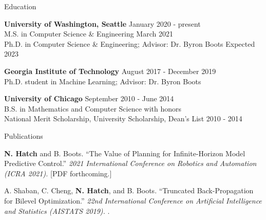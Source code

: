 \documentclass{resume} %
\begin{document}
\begin{rSection}{Education}

{\bf University of Washington, Seattle} \hfill {January 2020 - present} \\
M.S. in Computer Science \& Engineering \hfill March 2021 \\
Ph.D. in Computer Science \& Engineering; Advisor: Dr. Byron Boots \hfill Expected 2023

{\bf Georgia Institute of Technology} \hfill {August 2017 - December 2019} \\
Ph.D. student in Machine Learning; Advisor: Dr. Byron Boots

{\bf University of Chicago} \hfill {September 2010 - June 2014} \\
B.S. in Mathematics and Computer Science with honors \\
National Merit Scholarship, University Scholarship, Dean's List 2010 - 2014

\end{rSection}

\begin{rSection}{Publications}

{\bf N. Hatch} and B. Boots. ``The Value of Planning for Infinite-Horizon Model Predictive Control.''
{\em 2021 International Conference on Robotics and Automation (ICRA 2021).}
[PDF forthcoming.]

A. Shaban, C. Cheng, {\bf N. Hatch}, and B. Boots. ``Truncated Back-Propagation for Bilevel Optimization.''
{\em 22nd International Conference on Artificial Intelligence and Statistics (AISTATS 2019).}
.

\end{rSection}
\end{document}
